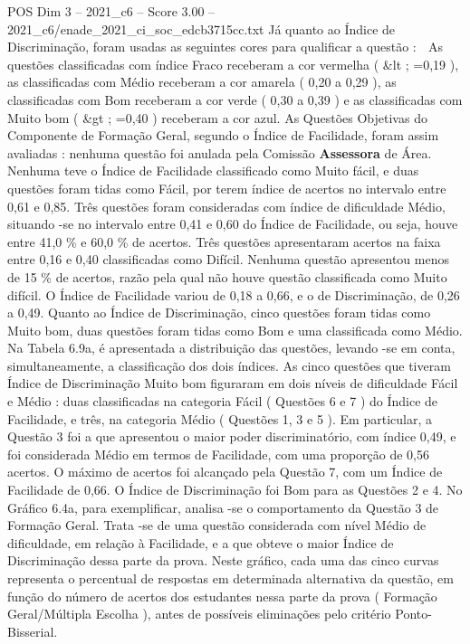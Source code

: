 \begin{textsample}{POS Dim 3 – 2021\_c6 – Score 3.00 – 2021\_c6/enade\_2021\_ci\_soc\_edcb3715cc.txt}
Já quanto ao Índice de Discriminação, foram usadas as seguintes cores para qualificar a questão :  As questões classificadas com índice Fraco receberam a cor vermelha ( \&lt ; =0,19 ), as classificadas com Médio receberam a cor amarela ( 0,20 a 0,29 ), as classificadas com Bom receberam a cor verde ( 0,30 a 0,39 ) e as classificadas com Muito bom ( \&gt ; =0,40 ) receberam a cor azul.
As Questões Objetivas do Componente de Formação Geral, segundo o Índice de Facilidade, foram assim avaliadas : nenhuma questão foi anulada pela Comissão \textbf{Assessora} de Área.
Nenhuma teve o Índice de Facilidade classificado como Muito fácil, e duas questões foram tidas como Fácil, por terem índice de acertos no intervalo entre 0,61 e 0,85.
Três questões foram consideradas com índice de dificuldade Médio, situando -se no intervalo entre 0,41 e 0,60 do Índice de Facilidade, ou seja, houve entre 41,0 \% e 60,0 \% de acertos.
Três questões apresentaram acertos na faixa entre 0,16 e 0,40 classificadas como Difícil.
Nenhuma questão apresentou menos de 15 \% de acertos, razão pela qual não houve questão classificada como Muito difícil.
O Índice de Facilidade variou de 0,18 a 0,66, e o de Discriminação, de 0,26 a 0,49.
Quanto ao Índice de Discriminação, cinco questões foram tidas como Muito bom, duas questões foram tidas como Bom e uma classificada como Médio.
Na Tabela 6.9a, é apresentada a distribuição das questões, levando -se em conta, simultaneamente, a classificação dos dois índices.
As cinco questões que tiveram Índice de Discriminação Muito bom figuraram em dois níveis de dificuldade Fácil e Médio : duas classificadas na categoria Fácil ( Questões 6 e 7 ) do Índice de Facilidade, e três, na categoria Médio ( Questões 1, 3 e 5 ).
Em particular, a Questão 3 foi a que apresentou o maior poder discriminatório, com índice 0,49, e foi considerada Médio em termos de Facilidade, com uma proporção de 0,56 acertos.
O máximo de acertos foi alcançado pela Questão 7, com um Índice de Facilidade de 0,66.
O Índice de Discriminação foi Bom para as Questões 2 e 4.
No Gráfico 6.4a, para exemplificar, analisa -se o comportamento da Questão 3 de Formação Geral.
Trata -se de uma questão considerada com nível Médio de dificuldade, em relação à Facilidade, e a que obteve o maior Índice de Discriminação dessa parte da prova.
Neste gráfico, cada uma das cinco curvas representa o percentual de respostas em determinada alternativa da questão, em função do número de acertos dos estudantes nessa parte da prova ( Formação Geral/Múltipla Escolha ), antes de possíveis eliminações pelo critério Ponto-Bisserial.

\end{textsample}
